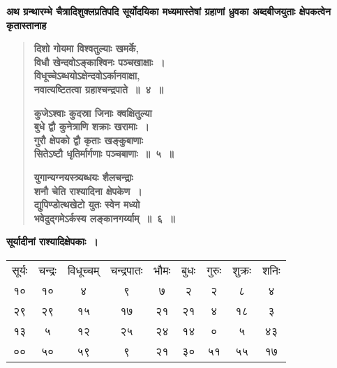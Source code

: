 \documentclass[11pt, openany]{book}
\begin{document}
{\small \textbf{अथ ग्रन्थारम्भे चैत्रादिशुक्लप्रतिपदि सूर्योदयिका मध्यमास्तेषां ग्रहाणां ध्रुवका अब्दबीजयुताः क्षेपकत्वेन कृतास्तानाह\textendash }}

 \label{1.4}
\begin{quote}
{\large \textbf{{\color{purple}दिशो गोयमा विश्वतुल्याः खमर्के,\\
विधौ खेन्दवोऽङ्काश्विनः पञ्चखाक्षाः~।\\
विधूच्चेऽब्धयोऽक्षेन्दवोऽर्कानवाक्षा,\\
नवात्यष्टितत्वा ग्रहाश्चन्द्रपाते~॥~४~॥}}
\vspace{1mm}

 \label{1.5}
\textbf{{\color{purple}कुजेऽश्वाः कुदस्रा जिनाः क्वक्षितुल्या\\
बुधे द्वौ कुनेत्राणि शक्राः खरामाः~।\\
गुरौ क्षेपको द्वौ कृताः खङ्कुबाणाः \\
सितेऽष्टौ धृतिर्मार्गणाः पञ्चबाणाः~॥~५~॥}}
\vspace{1mm}

 \label{1.6}
\textbf{{\color{purple}युगान्यग्नयस्त्र्यब्धयः शैलचन्द्राः \\
शनौ चेति राश्यादिना क्षेपकेण~।\\
द्युपिण्डोत्थखेटो युतः स्वेन मध्यो \\
भवेदुद्गमेऽर्कस्य लङ्कानगर्य्याम्~॥~६~॥}}}
\end{quote}

\newpage

\begin{center}
{\large \textbf{सूर्यादीनां राश्यादिक्षेपकाः~।}}
\end{center}

\begin{small}
\begin{tabular}{ccccccccc}
\hspace{-4mm} सूर्यः & चन्द्रः & विधूच्चम् & चन्द्रपातः & भौमः & बुधः & गुरुः & शुक्रः & शनिः \\
\hspace{-4mm} १० & १० & ४ & ९ & ७ & २ & २ & ८ & ४ \\
\hspace{-4mm} २९ & २९ & १५ & १७ & २१ & २१ & ४ & १८ & ३ \\
\hspace{-4mm} १३ & ५ & १२ & २५ & २४ & १४ & ० & ५ & ४३ \\
\hspace{-4mm} ०० & ५० & ५९ & ९ & २१ & ३० & ५१ & ५५ & १७\\
\end{tabular}
\end{small}
\vspace{4mm}
\end{document}
